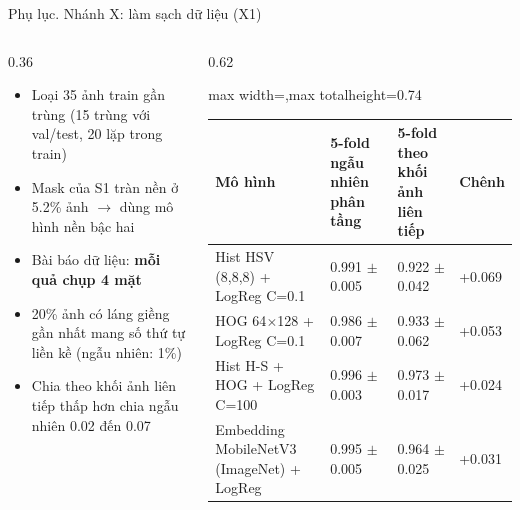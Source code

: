 \documentclass[aspectratio=169,10pt]{beamer}
\begin{document}
\begin{frame}{Phụ lục. Nhánh X: làm sạch dữ liệu (X1)}
\begin{columns}[T]
\begin{column}{0.36\textwidth}
\begin{itemize}\footnotesize
\item Loại 35 ảnh train gần trùng (15 trùng với val/test, 20 lặp trong train)
\item Mask của S1 tràn nền ở 5.2\% ảnh $\rightarrow$ dùng mô hình nền bậc hai
\item Bài báo dữ liệu: \textbf{mỗi quả chụp 4 mặt}
\item 20\% ảnh có láng giềng gần nhất mang số thứ tự liền kề (ngẫu nhiên: 1\%)
\item Chia theo khối ảnh liên tiếp thấp hơn chia ngẫu nhiên 0.02 đến 0.07
\end{itemize}
\end{column}
\begin{column}{0.62\textwidth}
\begin{center}\begin{adjustbox}{max width=\linewidth,max totalheight=0.74\textheight}
\begin{tabular}{llll}\toprule
\textbf{Mô hình} & \textbf{5-fold ngẫu nhiên phân tầng} & \textbf{5-fold theo khối ảnh liên tiếp} & \textbf{Chênh} \\ \midrule
Hist HSV (8,8,8) + LogReg C=0.1 & 0.991 $\pm$ 0.005 & 0.922 $\pm$ 0.042 & +0.069 \\
HOG 64$\times$128 + LogReg C=0.1 & 0.986 $\pm$ 0.007 & 0.933 $\pm$ 0.062 & +0.053 \\
Hist H-S + HOG + LogReg C=100 & 0.996 $\pm$ 0.003 & 0.973 $\pm$ 0.017 & +0.024 \\
Embedding MobileNetV3 (ImageNet) + LogReg & 0.995 $\pm$ 0.005 & 0.964 $\pm$ 0.025 & +0.031 \\
\bottomrule\end{tabular}
\end{adjustbox}\end{center}
\end{column}
\end{columns}
\end{frame}
\end{document}
